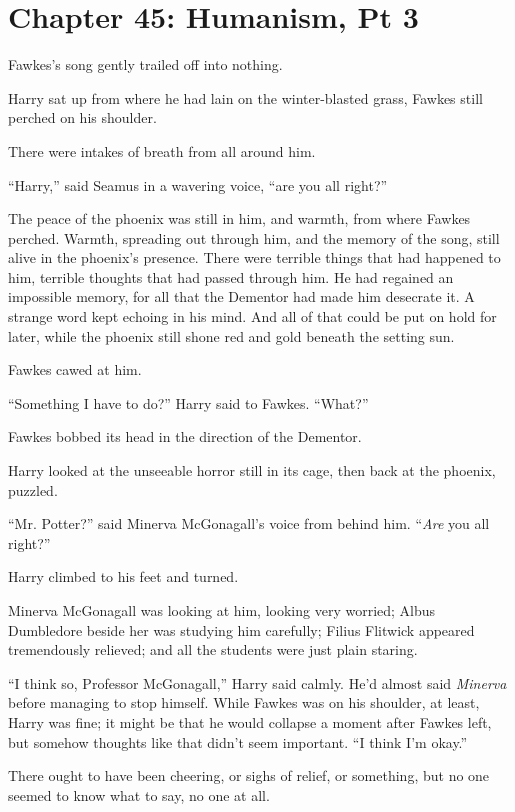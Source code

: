 \chapter{Chapter 45: Humanism, Pt 3}
Fawkes's song gently trailed off into nothing.

Harry sat up from where he had lain on the winter-blasted grass, Fawkes
still perched on his shoulder.

There were intakes of breath from all around him.

``Harry,'' said Seamus in a wavering voice, ``are you all right?''

The peace of the phoenix was still in him, and warmth, from where Fawkes
perched. Warmth, spreading out through him, and the memory of the song,
still alive in the phoenix's presence. There were terrible things that
had happened to him, terrible thoughts that had passed through him. He
had regained an impossible memory, for all that the Dementor had made
him desecrate it. A strange word kept echoing in his mind. And all of
that could be put on hold for later, while the phoenix still shone red
and gold beneath the setting sun.

Fawkes cawed at him.

``Something I have to do?'' Harry said to Fawkes. ``What?''

Fawkes bobbed its head in the direction of the Dementor.

Harry looked at the unseeable horror still in its cage, then back at the
phoenix, puzzled.

``Mr. Potter?'' said Minerva McGonagall's voice from behind him.
``\emph{Are} you all right?''

Harry climbed to his feet and turned.

Minerva McGonagall was looking at him, looking very worried; Albus
Dumbledore beside her was studying him carefully; Filius Flitwick
appeared tremendously relieved; and all the students were just plain
staring.

``I think so, Professor McGonagall,'' Harry said calmly. He'd almost
said \emph{Minerva} before managing to stop himself. While Fawkes was on
his shoulder, at least, Harry was fine; it might be that he would
collapse a moment after Fawkes left, but somehow thoughts like that
didn't seem important. ``I think I'm okay.''

There ought to have been cheering, or sighs of relief, or something, but
no one seemed to know what to say, no one at all.

